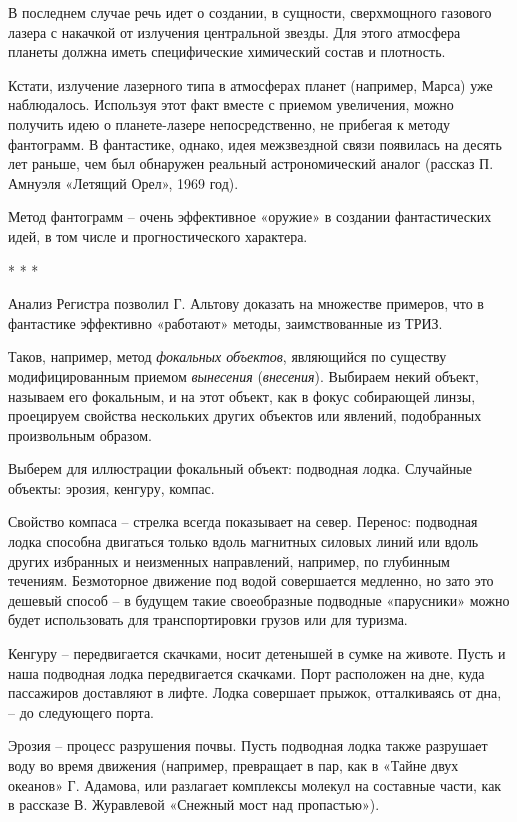 \documentclass[11pt,a4paper]{article}
\begin{document}
В последнем случае речь идет о создании, в сущности, сверхмощного газового
лазера с накачкой от излучения центральной звезды. Для этого атмосфера планеты
должна иметь специфические химический состав и плотность.

Кстати, излучение лазерного типа в атмосферах планет (например, Марса) уже
наблюдалось. Используя этот факт вместе с приемом увеличения, можно получить
идею о планете-лазере непосредственно, не прибегая к методу фантограмм. В
фантастике, однако, идея межзвездной связи появилась на десять лет раньше, чем
был обнаружен реальный астрономический аналог (рассказ П. Амнуэля «Летящий
Орел», 1969 год).

Метод фантограмм -- очень эффективное «оружие» в создании фантастических идей,
в том числе и прогностического характера.

\begin{center}
  * * *
\end{center}
Анализ Регистра позволил Г. Альтову доказать на множестве примеров, что в
фантастике эффективно «работают» методы, заимствованные из ТРИЗ.

Таков, например, метод \emph{фокальных объектов}, являющийся по существу
модифицированным приемом \emph{вынесения} (\emph{внесения}). Выбираем некий
объект, называем его фокальным, и на этот объект, как в фокус собирающей
линзы, проецируем свойства нескольких других объектов или явлений, подобранных
произвольным образом.

Выберем для иллюстрации фокальный объект: подводная лодка. Случайные объекты:
эрозия, кенгуру, компас.

Свойство компаса -- стрелка всегда показывает на север. Перенос: подводная
лодка способна двигаться только вдоль магнитных силовых линий или вдоль других
избранных и неизменных направлений, например, по глубинным течениям.
Безмоторное движение под водой совершается медленно, но зато это дешевый
способ -- в будущем такие своеобразные подводные «парусники» можно будет
использовать для транспортировки грузов или для туризма.

Кенгуру -- передвигается скачками, носит детенышей в сумке на животе. Пусть и
наша подводная лодка передвигается скачками. Порт расположен на дне, куда
пассажиров доставляют в лифте. Лодка совершает прыжок, отталкиваясь от дна, --
до следующего порта.

Эрозия -- процесс разрушения почвы. Пусть подводная лодка также разрушает воду
во время движения (например, превращает в пар, как в «Тайне двух океанов»
Г. Адамова, или разлагает комплексы молекул на составные части, как в рассказе
В. Журавлевой «Снежный мост над пропастью»).
\end{document}

